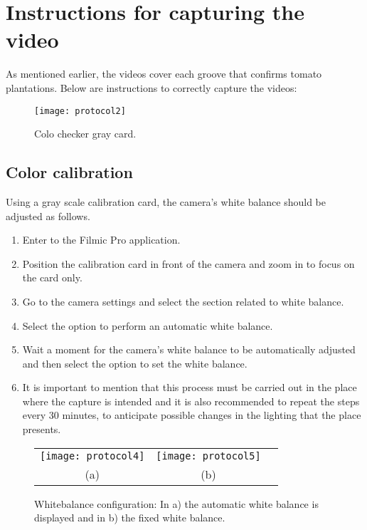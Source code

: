 \section{Instructions for capturing the video}

As mentioned earlier, the videos cover each groove that confirms tomato plantations. Below are instructions to correctly capture the videos:

\begin{figure}[htb]
  \centering
  \texttt{[image: protocol2]}
  \caption[Color calibration]{Colo checker gray card.}
  \label{fig:color_calibration}
\end{figure}

\subsection{Color calibration}

Using a gray scale calibration card, the camera's white balance should be adjusted as follows.

\begin{enumerate}
 \item Enter to the Filmic Pro application.
 \item Position the calibration card in front of the camera and zoom in to focus on the card only.
 \item Go to the camera settings and select the section related to white balance.
 \item Select the option to perform an automatic white balance.
 \item Wait a moment for the camera's white balance to be automatically adjusted and then select the option to set the white balance.
 \item It is important to mention that this process must be carried out in the place where the capture is intended and it is also recommended to repeat the steps every 30 minutes, to anticipate possible changes in the lighting that the place presents.
\end{enumerate}

\begin{figure}[H]
\begin{minipage}{\linewidth}
  \centering
  \begin{tabular}{ccc}
  \texttt{[image: protocol4]}
    & \texttt{[image: protocol5]} \\
  (a) & (b) 
  \end{tabular}
  \end{minipage}
\caption[Whitebalance configuration]{Whitebalance configuration: In a) the automatic white balance is displayed and in b) the fixed white balance.}
\label{fig:whitebalance}
\end{figure}

